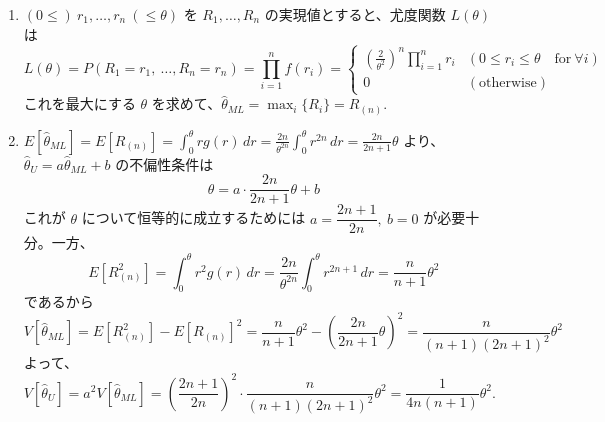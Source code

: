 \documentclass[./main.tex]{subfiles}
\begin{document}
\begin{enumerate}
        \item $(0 \leq) \  r_1, \dots, r_n \ (\leq \theta)$ を $R_1, \dots, R_n$ の実現値とすると、尤度関数 $L(\theta)$ は
        \begin{equation*}
            L(\theta)
                = P (R_1 = r_1, \ \dots, R_n = r_n)
                = \prod_{i=1}^n f(r_i)
                = \begin{cases}
                \displaystyle \left( \frac{2}{\theta^{2}} \right)^n \prod_{i=1}^n {r_i} & (0 \leq r_i \leq \theta \quad \text{for} \ \forall i)\\
                0 & (\text{otherwise})
                \end{cases}
        \end{equation*}
        これを最大にする $\theta$ を求めて、$\hat{\theta}_{ML} = \max_i \{ R_i \} = R_{(n)}$.

        \item $\displaystyle E[\hat{\theta}_{ML}]  = E[R_{(n)}] 
            = \int_0^\theta r g(r) \, dr = \frac{2n}{\theta^{2n}} \int_0^\theta r^{2n} \, dr
            = \frac{2n}{2n + 1} \theta$ より、$\hat{\theta}_U = a \hat{\theta}_{ML} + b$ の不偏性条件は
        \begin{equation*}
           \theta = a \cdot \frac{2n}{2n + 1} \theta + b
        \end{equation*}
        これが $\theta$ について恒等的に成立するためには $a = \dfrac{2n + 1}{2n}, \ b = 0$ が必要十分。一方、
        \begin{equation*}
        E[R_{(n)}^2] = \int_0^\theta r^2 g(r) \, dr 
            = \frac{2n}{\theta^{2n}} \int_0^\theta r^{2n+1} \, dr
            = \frac{n}{n + 1} \theta^2
        \end{equation*}
        であるから
        \begin{equation*}
            V [\hat{\theta}_{ML}]
                = E[ R_{(n)}^2 ] - E[ R_{(n)}]^2
                = \frac{n}{n+1}\theta^2 - \left(  \frac{2n}{2n + 1} \theta \right)^2
                = \frac{n}{(n+1)(2n+1)^2} \theta^2
        \end{equation*}
        よって、$V[\hat{\theta}_U] = a^2 V [\hat{\theta}_{ML}]
            = \left( \dfrac{2n + 1}{2n} \right)^2 \cdot \dfrac{n}{(n+1)(2n+1)^2} \theta^2
            = \dfrac{1}{4n (n+1)} \theta^2$.
    \end{enumerate}
\end{document}
